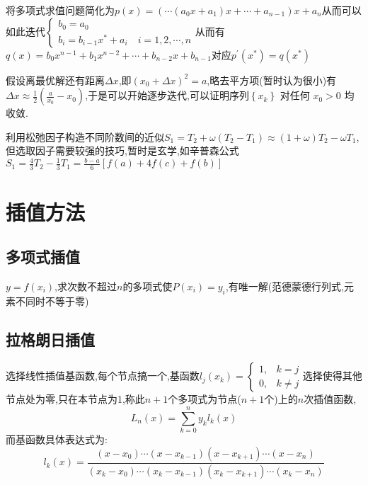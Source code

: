 \documentclass[10pt]{yerbaformat}
\begin{document}
\begin{algorithm}[多项式求值的秦九韶算法]
    将多项式求值问题简化为$p(x)=\left(\cdots\left(a_{0} x+a_{1}\right) x+\cdots+a_{n-1}\right) x+a_{n}$从而可以如此迭代$\left\{\begin{array}{l}b_{0}=a_{0} \\ b_{i}=b_{i-1} x^{*}+a_{i} \quad i=1,2, \cdots, n\end{array}\right.$从而有$q(x)=b_{0} x^{n-1}+b_{1} x^{n-2}+\cdots+b_{n-2} x+b_{n-1}$对应$p^{\prime}\left(x^{*}\right)=q\left(x^{*}\right)$
\end{algorithm}

\begin{algorithm}[迭代法求根]
    假设离最优解还有距离$\Delta x$,即$\left(x_{0}+\Delta x\right)^{2}=a$,略去平方项(暂时认为很小)有$\Delta x \approx \frac{1}{2}\left(\frac{a}{x_{0}}-x_{0}\right)$,于是可以开始逐步迭代,可以证明序列$\left\{x_{k}\right\}$ 对任何 $x_{0}>0$ 均收敛.
\end{algorithm}

\begin{algorithm}[松弛法]
    利用松弛因子构造不同阶数间的近似$S_{1}=T_{2}+\omega\left(T_{2}-T_{1}\right) \approx(1+\omega) T_{2}-\omega T_{1}$,但选取因子需要较强的技巧,暂时是玄学,如辛普森公式$S_{1}=\frac{4}{3} T_{2}-\frac{1}{3} T_{1}=\frac{b-a}{6}[f(a)+4 f(c)+f(b)]$
\end{algorithm}

\section{插值方法}

\subsection{多项式插值}
\begin{theorem}
    $y=f\left(x_{i}\right)$,求次数不超过$n$的多项式使$P\left(x_{i}\right)=y_{i}$,有唯一解(范德蒙德行列式,元素不同时不等于零)
\end{theorem}

\subsection{拉格朗日插值}\label{Lag}
\par 选择线性插值基函数,每个节点搞一个,基函数$l_{j}\left(x_{k}\right)=\left\{\begin{array}{ll}1, & k=j \\ 0, & k \neq j\end{array}\right.$选择使得其他节点处为零,只在本节点为1,称此$n+1$个多项式为节点($n+1$个)上的$n$次插值函数,$$L_{n}(x)=\sum_{k=0}^{n} y_{k} l_{k}(x)$$而基函数具体表达式为:
$$l_{k}(x)=\frac{\left(x-x_{0}\right) \cdots\left(x-x_{k-1}\right)\left(x-x_{k+1}\right) \cdots\left(x-x_{n}\right)}{\left(x_{k}-x_{0}\right) \cdots\left(x_{k}-x_{k-1}\right)\left(x_{k}-x_{k+1}\right) \cdots\left(x_{k}-x_{n}\right)}$$
\end{document}
